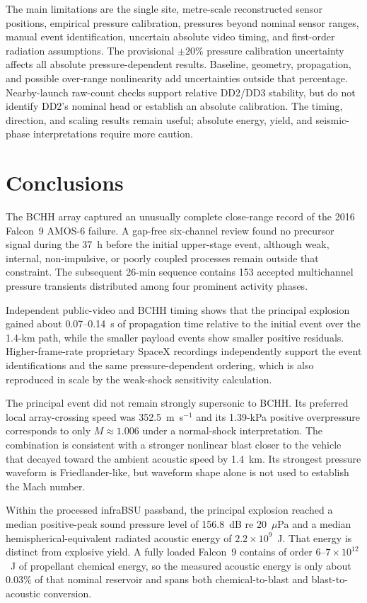\documentclass[]{seismica}
\begin{document}
The main limitations are the single site, metre-scale reconstructed sensor
positions, empirical pressure calibration, pressures beyond nominal sensor
ranges, manual event identification, uncertain absolute video timing, and
first-order radiation assumptions. The provisional $\pm20\%$ pressure
calibration uncertainty affects all absolute pressure-dependent results.
Baseline, geometry, propagation, and possible over-range nonlinearity add
uncertainties outside that percentage. Nearby-launch raw-count checks support
relative DD2/DD3 stability, but do not identify DD2's nominal head or establish
an absolute calibration. The timing, direction, and scaling results remain
useful; absolute energy, yield, and seismic-phase interpretations require more
caution.


\section{Conclusions}
\label{sec:conclusions}

The BCHH array captured an unusually complete close-range record of the 2016
Falcon~9 AMOS-6 failure. A gap-free six-channel review found no precursor
signal during the 37~h before the initial upper-stage event, although weak,
internal, non-impulsive, or poorly coupled processes remain outside that
constraint. The subsequent 26-min sequence contains 153 accepted multichannel
pressure transients distributed among four prominent activity phases.

Independent public-video and BCHH timing shows that the principal explosion
gained about 0.07--0.14~s of propagation time relative to the initial event
over the 1.4-km path, while the smaller payload events show smaller positive
residuals. Higher-frame-rate proprietary SpaceX recordings independently
support the event identifications and the same pressure-dependent ordering,
which is also reproduced in scale by the weak-shock sensitivity calculation.

The principal event did not remain strongly supersonic to BCHH. Its preferred
local array-crossing speed was 352.5~m~s$^{-1}$ and its 1.39-kPa positive
overpressure corresponds to only $M\approx1.006$ under a normal-shock
interpretation. The combination is consistent with a stronger nonlinear blast
closer to the vehicle that decayed toward the ambient acoustic speed by
1.4~km. Its strongest pressure waveform is Friedlander-like, but waveform
shape alone is not used to establish the Mach number.

Within the processed infraBSU passband, the principal explosion reached a
median positive-peak sound pressure level of 156.8~dB re 20~$\mu$Pa and a
median hemispherical-equivalent radiated acoustic energy of
$2.2\times10^9$~J. That energy is distinct from explosive yield. A fully loaded
Falcon~9 contains of order $6$--$7\times10^{12}$~J of propellant chemical
energy, so the measured acoustic energy is only about 0.03\% of that nominal
reservoir and spans both chemical-to-blast and blast-to-acoustic conversion.
\end{document}
